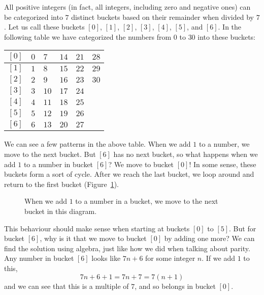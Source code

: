 \documentclass[a4paper,10pt]{report}
\begin{document}
All positive integers (in fact, all integers, including zero and negative ones)
can be categorized into \(7\) distinct buckets based on their remainder when
divided by \(7\). Let us call these buckets \([0]\), \([1]\), \([2]\), \([3]\),
\([4]\), \([5]\), and \([6]\). In the following table we have categorized the
numbers from \(0\) to \(30\) into these buckets:

\begin{center}
 \begin{tabular}{|c|lllll|}
  \hline
  \([0]\) & \(0\) & \(7\) & \(14\) & \(21\) & \(28\) \\ \hline
  \([1]\) & \(1\) & \(8\) & \(15\) & \(22\) & \(29\) \\ \hline
  \([2]\) & \(2\) & \(9\) & \(16\) & \(23\) & \(30\) \\ \hline
  \([3]\) & \(3\) & \(10\) & \(17\) & \(24\) & \\ \hline
  \([4]\) & \(4\) & \(11\) & \(18\) & \(25\) & \\ \hline
  \([5]\) & \(5\) & \(12\) & \(19\) & \(26\) & \\ \hline
  \([6]\) & \(6\) & \(13\) & \(20\) & \(27\) & \\ \hline
 \end{tabular}
\end{center}

We can see a few patterns in the above table. When we add \(1\) to a number, we
move to the next bucket. But \([6]\) has no next bucket, so what happens when
we add \(1\) to a number in bucket \([6]\)? We move to bucket \([0]\)! In some
sense, these buckets form a sort of cycle. After we reach the last bucket, we
loop around and return to the first bucket (Figure~\ref{ma:equiv-class-cycle}).

\begin{figure}

 \caption{When we add \(1\) to a number in a bucket, we move to the next bucket
 in this diagram.}

 \label{ma:equiv-class-cycle}
\end{figure}

This behaviour should make sense when starting at buckets \([0]\) to \([5]\).
But for bucket \([6]\), why is it that we move to bucket \([0]\) by adding one
more? We can find the solution using algebra, just like how we did when talking
about parity. Any number in bucket \([6]\) looks like \(7n+6\) for some integer
\(n\). If we add \(1\) to this, \[ 7n+6 + 1 = 7n+7 = 7(n+1) \] and we can see
that this is a multiple of \(7\), and so belongs in bucket \([0]\).
\end{document}
